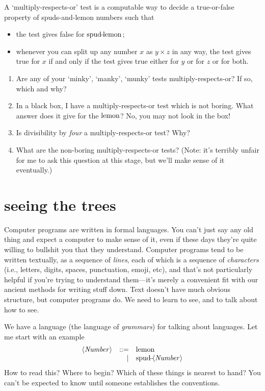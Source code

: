 \documentclass{book}
\begin{document}
\begin{puz}
  A `multiply-respects-or' test is a computable way to decide a true-or-false property of spuds-and-lemon numbers such that
  \begin{itemize}
  \item the test gives false for $\mbox{spud}\!\!\!-\!\!\!\mbox{lemon}$;
  \item whenever you can split up any number $x$ as $y\times z$ in any way, the test gives true for $x$ if and only if the test gives true either for $y$ or for $z$ or for both.
  \end{itemize}
  \begin{enumerate}
  \item Are any of your `minky', `manky', `munky' tests multiply-respects-or? If so, which and why?
  \item In a black box, I have a multiply-respects-or test which is not boring. What answer does it give for the $\mbox{lemon}$? No, you may not look in the box!
  \item Is divisibility by \emph{four} a multiply-respects-or test? Why?
  \item What are the non-boring multiply-respects-or tests? (Note: it's terribly unfair for me to ask this question at this stage, but we'll make sense of it eventually.)
  \end{enumerate}
\end{puz}




\chapter{seeing the trees}

Computer programs are written in formal languages. You can't just say any old thing and expect a computer to make sense of it, even if these days they're quite willing to bullshit you that they understand. Computer programs tend to be written textually, as a sequence of \emph{lines}, each of which is a sequence of \emph{characters} (i.e., letters, digits, spaces, punctuation, emoji, etc), and that's not particularly helpful if you're trying to understand them---it's merely a convenient fit with our ancient methods for writing stuff down. Text doesn't have much obvious structure, but computer programs do. We need to learn to see, and to talk about how to see.

We have a language (the language of \emph{grammars}) for talking about languages. Let me start with an example
\newcommand{\nt}[1]{\langle\mathit{#1}\rangle}
\[\begin{array}{rrl}
\nt{Number} & ::= & \lemon\\
            &   | & \spud\nt{Number}
\end{array}\]
How to read this? Where to begin? Which of these things is nearest to hand? You can't be expected to know until someone establishes the conventions.
\end{document}
